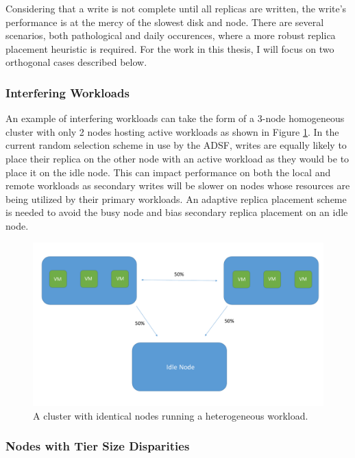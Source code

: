 \documentclass[12pt]{article}
\begin{document}
  Considering that a write is not complete until all replicas are written, the
  write's performance is at the mercy of the slowest disk and node.  There are
  several scenarios, both pathological and daily occurences, where a more
  robust replica placement heuristic is required. For the work in this thesis,
  I will focus on two orthogonal cases described below.

    \subsubsection{Interfering Workloads}

    An example of interfering workloads can take the form of a 3-node
    homogeneous cluster with only 2 nodes hosting active workloads as shown in
    Figure \ref{fig:workload_disparity}. In the current random selection scheme
    in use by the ADSF, writes are equally likely to place their replica on the
    other node with an active workload as they would be to place it on the idle
    node. This can impact performance on both the local and remote workloads as
    secondary writes will be slower on nodes whose resources are being utilized
    by their primary workloads. An adaptive replica placement scheme is needed
    to avoid the busy node and bias secondary replica placement on an idle
    node. 

    \begin{figure}[h]
      \centering
      \includegraphics[scale=0.45]{images/homogeneous_workload_disparity.pdf} 
      \caption{A cluster with identical nodes running a heterogeneous workload.}
      \label{fig:workload_disparity}
    \end{figure}

    \subsubsection{Nodes with Tier Size Disparities}
\end{document}
